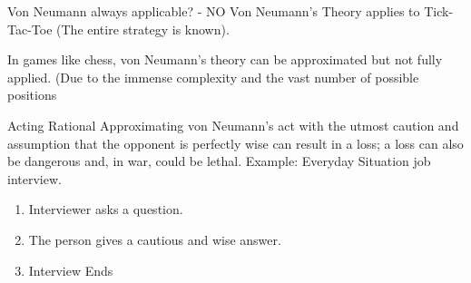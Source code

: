 \documentclass[xetex,notheorems,hyperref={pdfpagelabels=true},xcolor=table]{beamer}
\theoremstyle{plain}
\theoremstyle{definition}
\theoremstyle{example}
\theoremstyle{example}
\begin{document}
\begin{frame}{Von Neumann always applicable? - NO}
Von Neumann's Theory applies to Tick-Tac-Toe (The entire strategy is known).
    \begin{figure}[h]
  \centering
\end{figure}
In games like chess, von Neumann's theory can be approximated but not fully applied. (Due to the immense complexity and the vast number of possible positions 
\begin{figure}[h]
\end{figure}
\end{frame}

\begin{frame}{Acting Rational}
Approximating von Neumann's act with the utmost caution and assumption that the opponent is perfectly wise can result in a loss; a loss can also be dangerous and, in war, could be lethal.
\newline \newline Example: Everyday Situation job interview. 
    \begin{figure}[h]
  \centering
\end{figure}
\begin{enumerate}
    \item Interviewer asks a question.
    \item The person gives a cautious and wise answer. 
    \item Interview Ends
\end{enumerate}
\end{frame}
\end{document}

